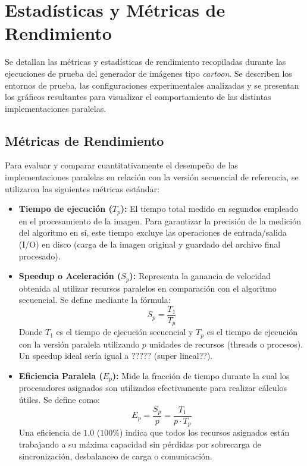 \chapter{Estadísticas y Métricas de Rendimiento}

Se detallan las métricas y estadísticas de rendimiento recopiladas durante las ejecuciones de prueba del generador de 
imágenes tipo \textit{cartoon}. Se describen los entornos de prueba, las configuraciones experimentales analizadas y se 
presentan los gráficos resultantes para visualizar el comportamiento de las distintas implementaciones paralelas.

\section{Métricas de Rendimiento}

Para evaluar y comparar cuantitativamente el desempeño de las implementaciones paralelas en relación con la versión 
secuencial de referencia, se utilizaron las siguientes métricas estándar:

\begin{itemize}
    \item \textbf{Tiempo de ejecución ($T_p$):} El tiempo total medido en segundos empleado en el procesamiento 
    de la imagen. Para garantizar la precisión de la medición del algoritmo en sí, este tiempo excluye las operaciones 
    de entrada/salida (I/O) en disco (carga de la imagen original y guardado del archivo final procesado).
    
    \item \textbf{Speedup o Aceleración ($S_p$):} Representa la ganancia de velocidad obtenida al utilizar recursos 
    paralelos en comparación con el algoritmo secuencial. Se define mediante la fórmula:
    \[S_p = \frac{T_1}{T_p}\]
    Donde $T_1$ es el tiempo de ejecución secuencial y $T_p$ es el tiempo de ejecución con la versión paralela 
    utilizando $p$ unidades de recursos (threads o procesos). Un speedup ideal sería igual a $?????$ (super lineal??).
    
    \item \textbf{Eficiencia Paralela ($E_p$):} Mide la fracción de tiempo durante la cual los procesadores asignados 
    son utilizados efectivamente para realizar cálculos útiles. Se define como:
    \[E_p = \frac{S_p}{p} = \frac{T_1}{p \cdot T_p}\]
    Una eficiencia de $1.0$ ($100\%$) indica que todos los recursos asignados están trabajando a su máxima capacidad 
    sin pérdidas por sobrecarga de sincronización, desbalanceo de carga o comunicación.
\end{itemize}

